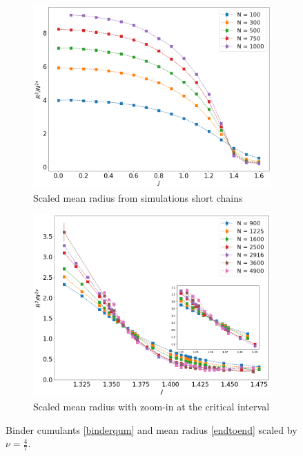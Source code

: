 \begin{figure}[!ht]
	\begin{subfigure}[b]{0.45\textwidth}
	\includegraphics[width=\textwidth]{Images/rscaling_shortchains.png}
		\caption{ Scaled mean radius from simulations short chains   }
		\label{fig:bcshort_shortradius}
	\end{subfigure}
	\begin{subfigure}[b]{0.45\textwidth}
		\includegraphics[width=\textwidth]{Images/rscaling_longchains.png}
		\caption{Scaled mean radius with zoom-in at the critical interval }
		\label{fig:bcshort_longradius}
	\end{subfigure}
	\caption{ Binder  cumulants \eqref{binderqum} and mean radius \eqref{endtoend} scaled by $\nu=\frac{4}{7}$.   }
	\label{fig:bcshort}
\end{figure}

